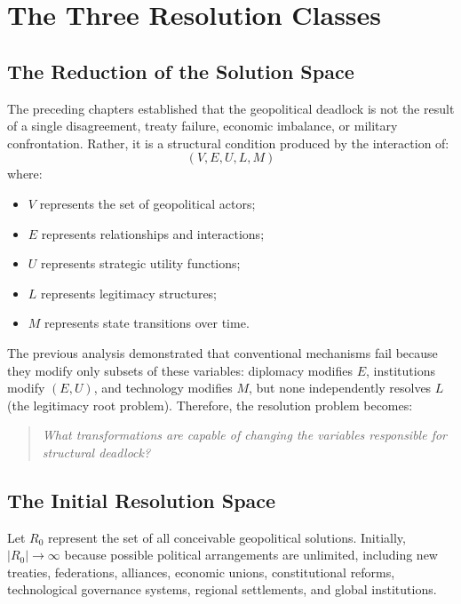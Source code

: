\documentclass[11pt,openany]{book}
\theoremstyle{plain}
\theoremstyle{definition}
\begin{document}
\chapter{The Three Resolution Classes}

\section*{The Reduction of the Solution Space}

The preceding chapters established that the geopolitical deadlock is not the result of a single disagreement, treaty failure, economic imbalance, or military confrontation. Rather, it is a structural condition produced by the interaction of:
\[
(V, E, U, L, M)
\]
where:
\begin{itemize}
\item \(V\) represents the set of geopolitical actors;
\item \(E\) represents relationships and interactions;
\item \(U\) represents strategic utility functions;
\item \(L\) represents legitimacy structures;
\item \(M\) represents state transitions over time.
\end{itemize}

The previous analysis demonstrated that conventional mechanisms fail because they modify only subsets of these variables: diplomacy modifies \(E\), institutions modify \((E, U)\), and technology modifies \(M\), but none independently resolves \(L\) (the legitimacy root problem). Therefore, the resolution problem becomes:
\begin{quote}
\textit{What transformations are capable of changing the variables responsible for structural deadlock?}
\end{quote}

\section*{The Initial Resolution Space}

Let \(R_0\) represent the set of all conceivable geopolitical solutions. Initially, \(|R_0| \to \infty\) because possible political arrangements are unlimited, including new treaties, federations, alliances, economic unions, constitutional reforms, technological governance systems, regional settlements, and global institutions.
\end{document}

